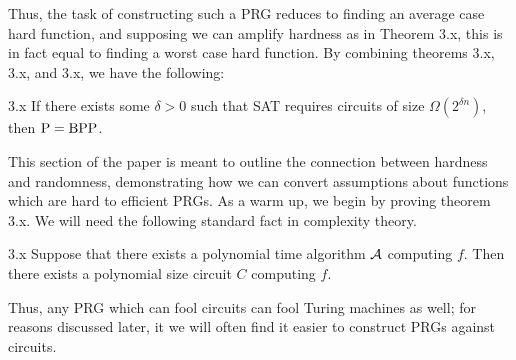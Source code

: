 \documentclass[11pt]{article}
\begin{document}
Thus, the task of constructing such a PRG reduces to finding an average case hard function, and supposing we can amplify hardness as in Theorem 3.x, this is in fact equal to finding a worst case hard function. By combining theorems 3.x, 3.x, and 3.x, we have the following:

\begin{corollary}{3.x}
    If there exists some $\delta > 0$ such that SAT requires circuits of size $\Omega(2^{\delta n})$, then $\mathrm{P} = \mathrm{BPP}$.
\end{corollary}

This section of the paper is meant to outline the connection between hardness and randomness, demonstrating how we can convert assumptions about functions which are hard to efficient PRGs. As a warm up, we begin by proving theorem 3.x. We will need the following standard fact in complexity theory.

\begin{fact}{3.x}
    Suppose that there exists a polynomial time algorithm $\mathcal{A}$ computing $f$. Then there exists a polynomial size circuit $C$ computing $f$.
\end{fact}

Thus, any PRG which can fool circuits can fool Turing machines as well; for reasons discussed later, it we will often find it easier to construct PRGs against circuits.
\end{document}
